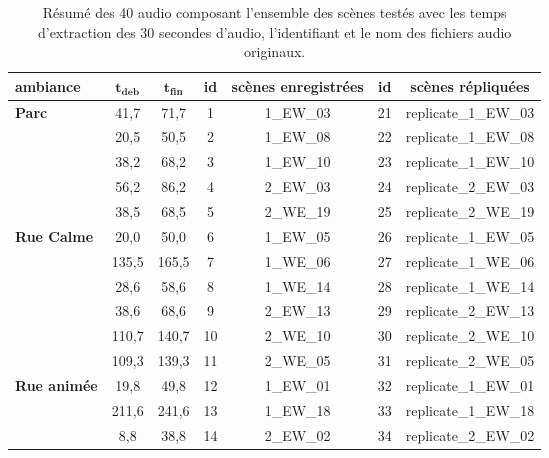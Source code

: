 \begin{table}[ht]
\caption{Résumé des 40 audio composant l'ensemble des scènes testés avec les temps d'extraction des 30 secondes d'audio, l'identifiant et le nom des fichiers audio originaux.}
\centering
\begin{tabular}{|p{2cm}|c|c||c|c||c|c|}
\toprule
\textbf{ambiance}                          & $\mathbf{t_{deb}}$          & $\mathbf{t_{fin}}$          & \textbf{id}   & \textbf{scènes enregistrées}         & \textbf{id}   & \textbf{scènes répliquées} \\
\midrule
\multirow{5}{2cm}{\textbf{Parc}}             & 41,7 & 71,7 & 1  & 1\_EW\_03 & 21 & replicate\_1\_EW\_03         \\
                                  & 20,5 & 50,5 & 2  & 1\_EW\_08 & 22 & replicate\_1\_EW\_08         \\
                                  & 38,2 & 68,2 & 3  & 1\_EW\_10 & 23 & replicate\_1\_EW\_10         \\
                                  & 56,2 & 86,2 & 4  & 2\_EW\_03 & 24 & replicate\_2\_EW\_03         \\
                                  & 38,5 & 68,5 & 5  & 2\_WE\_19 & 25 & replicate\_2\_WE\_19         \\
\hline
\multirow{6}{2cm}{\textbf{Rue Calme}}        & 20,0 & 50,0 & 6  & 1\_EW\_05 & 26 & replicate\_1\_EW\_05     \\
                                  & 135,5 & 165,5 & 7  & 1\_WE\_06 & 27 & replicate\_1\_WE\_06     \\
                                  & 28,6 & 58,6 & 8  & 1\_WE\_14 & 28 & replicate\_1\_WE\_14     \\
                                  & 38,6 & 68,6 & 9  & 2\_EW\_13 & 29 & replicate\_2\_EW\_13     \\
                                  & 110,7 & 140,7 & 10 & 2\_WE\_10 & 30 & replicate\_2\_WE\_10     \\
                                  & 109,3 & 139,3 & 11 & 2\_WE\_05 & 31 & replicate\_2\_WE\_05     \\
\hline
\multirow{4}{2cm}{\textbf{Rue animée}}       & 19,8 & 49,8 & 12 & 1\_EW\_01 & 32 & replicate\_1\_EW\_01     \\
                                  & 211,6 & 241,6 & 13 & 1\_EW\_18 & 33 & replicate\_1\_EW\_18     \\
                                  & 8,8 & 38,8 & 14 & 2\_EW\_02 & 34 & replicate\_2\_EW\_02     \\

\end{tabular}
\end{table}
